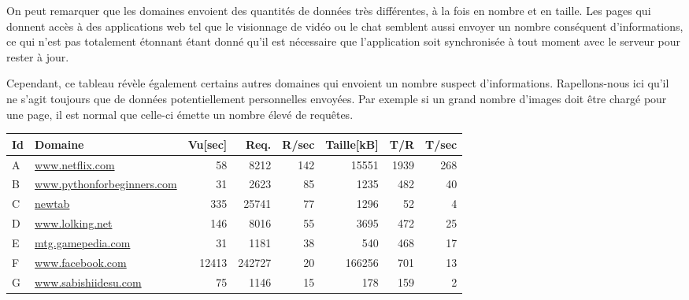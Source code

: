			On peut remarquer que les domaines envoient des quantités de données très différentes, à la fois en nombre et en taille. Les pages qui donnent accès à des applications web tel que le visionnage de vidéo ou le chat semblent aussi envoyer un nombre conséquent d'informations, ce qui n'est pas totalement étonnant étant donné qu'il est nécessaire que l'application soit synchronisée à tout moment avec le serveur pour rester à jour.

			Cependant, ce tableau révèle également certains autres domaines qui envoient un nombre suspect d'informations. Rapellons-nous ici qu'il ne s'agit toujours que de données potentiellement personnelles envoyées. Par exemple si un grand nombre d'images doit être chargé pour une page, il est normal que celle-ci émette un nombre élevé de requêtes.

			\begin{table}[]
\centering
\begin{tabular}{llrrrrrr}
\textbf{Id} & \textbf{Domaine}           & \textbf{Vu{[}sec{]}} & \textbf{Req.} & \textbf{R/sec} & \textbf{Taille{[}kB{]}} & \textbf{T/R} & \textbf{T/sec} \\ \hline
A & \scriptsize \url{www.netflix.com}            & 58                    & 8212          & 142                  & 15551                    & 1939         & 268            \\
B & \scriptsize \url{www.pythonforbeginners.com} & 31                    & 2623          & 85                   & 1235                     & 482          & 40             \\
C & \scriptsize \url{newtab}                     & 335                   & 25741         & 77                   & 1296                     & 52           & 4              \\
D & \scriptsize \url{www.lolking.net}            & 146                   & 8016          & 55                   & 3695                     & 472          & 25             \\
E & \scriptsize \url{mtg.gamepedia.com}          & 31                    & 1181          & 38                   & 540                      & 468          & 17             \\
F & \scriptsize \url{www.facebook.com}           & 12413                 & 242727        & 20                   & 166256                   & 701          & 13             \\
G & \scriptsize \url{www.sabishiidesu.com}       & 75                    & 1146          & 15                   & 178                      & 159          & 2              \\

\end{tabular}
\end{table}
